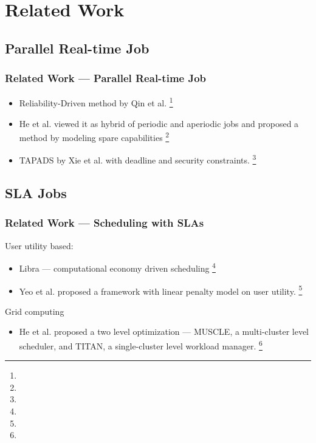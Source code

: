 \section{Related Work}
\subsection{Parallel Real-time Job}
\begin{frame}
  \frametitle{Related Work --- Parallel Real-time Job}
  \begin{itemize}
    \item Reliability-Driven method by Qin et al.
      \footnote[frame]{\tiny{}}
    \item He et al. viewed it as hybrid of periodic and aperiodic jobs
      and proposed a method by modeling spare capabilities
      \footnote[frame]{\tiny{}}
    \item TAPADS by Xie et al. with deadline and security constraints.
      \footnote[frame]{\tiny{}}
  \end{itemize}
\end{frame}
\subsection{SLA Jobs}
\begin{frame}
  \frametitle{Related Work --- Scheduling with SLAs}
  User utility based:
  \begin{itemize}
    \item Libra --- computational economy driven scheduling
      \footnote[frame]{\tiny{}}
    \item Yeo et al. proposed a framework with linear penalty model on
      user utility.
      \footnote[frame]{\tiny{}}
  \end{itemize}
  Grid computing
  \begin{itemize}
    \item He et al. proposed a two level optimization --- MUSCLE, a
      multi-cluster level scheduler, and TITAN, a single-cluster level
      workload manager.
      \footnote[frame]{\tiny{}}
  \end{itemize}
\end{frame}
